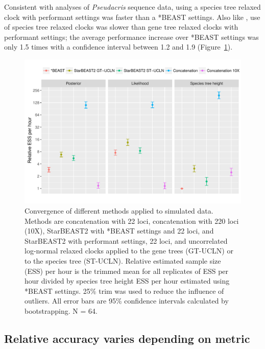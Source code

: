\documentclass[12pt]{article}
\begin{document}
Consistent with analyses of \textit{Pseudacris} sequence data, using a species
tree relaxed clock with performant settings was faster than a *BEAST settings.
Also like , use of species tree relaxed clocks was slower than
gene tree relaxed clocks with performant settings; the average performance
increase over *BEAST settings was only 1.5 times with a confidence interval
between 1.2 and 1.9 (Figure~\ref{fig:simulatedEssPerHour}).

\begin{figure}[htb!]
\centering
\includegraphics[width=16cm]{multiple_ess_per_hour.pdf}
\caption
{Convergence of different methods applied to simulated data. Methods are
concatenation with 22 loci, concatenation with 220 loci (10X), StarBEAST2 with
*BEAST settings and 22 loci, and StarBEAST2 with performant settings, 22 loci,
and uncorrelated log-normal relaxed clocks applied to the gene trees (GT-UCLN) or
to the species tree (ST-UCLN). Relative estimated sample size (ESS) per hour is the trimmed mean for all replicates of
ESS per hour divided by species tree height ESS per hour estimated using *BEAST
settings. 25\% trim was used to reduce the influence of
outliers. All error bars are 95\% confidence intervals calculated by
bootstrapping. N = 64.}
\label{fig:simulatedEssPerHour}
\end{figure}

\subsection*{Relative accuracy varies depending on metric}
\end{document}
